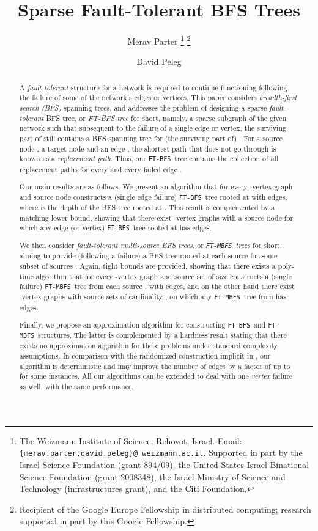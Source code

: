 \documentclass[12pt]{article}
\def\FTMBFS{\mbox{\tt FT-MBFS}}
\def\FTBFS{\mbox{\tt FT-BFS}}
\begin{document}
\title{Sparse Fault-Tolerant BFS Trees}
\author{
Merav Parter
\thanks{The Weizmann Institute of Science, Rehovot, Israel.
Email: {\tt \{merav.parter,david.peleg\}@ weizmann.ac.il}.
Supported in part by the Israel Science Foundation
(grant 894/09), the United States-Israel Binational Science Foundation
(grant 2008348), the Israel Ministry of Science and Technology
(infrastructures grant), and the Citi Foundation.}
\thanks{Recipient of the Google Europe Fellowship in distributed computing;
 research supported in part by this Google Fellowship.}
\and
David Peleg 
}


\maketitle

\begin{abstract}
A {\em fault-tolerant} structure for a network is required to continue
functioning following the failure of some of the network's edges or vertices.
This paper considers {\em breadth-first search (BFS)} spanning trees,
and addresses the problem of designing a sparse {\em fault-tolerant} BFS tree,
or {\em FT-BFS tree} for short, namely, a sparse subgraph  of the given network 
such that subsequent to the failure of a single edge or vertex,
the surviving part  of  still contains a BFS spanning tree for
(the surviving part of) . For a source node , a target node  and an edge , the shortest  path  that does not go through   is known as a \emph{replacement path}. Thus, our \FTBFS\ tree contains the collection of all replacement paths  for every  and every failed edge .
\par
Our main results are as follows. We present an algorithm that
for every -vertex graph  and source node  constructs
a (single edge failure) \FTBFS\ tree rooted at  with
 edges,
where  is the depth of the BFS tree rooted at .
This result is complemented by a matching lower bound, showing that
there exist -vertex graphs with a source node  for which any edge
(or vertex) \FTBFS\ tree rooted at  has  edges.
\par
We then consider {\em fault-tolerant multi-source BFS trees},
or {\em \FTMBFS\ trees} for short,
aiming to provide (following a failure) a BFS tree rooted at each source
 for some subset of sources .
Again, tight bounds are provided,
showing that there exists a poly-time algorithm that
for every -vertex graph and source set  of size 
constructs  a (single failure) \FTMBFS\ tree
 from each source , with 
edges, and on the other hand there exist -vertex graphs with source sets
 of cardinality , on which any \FTMBFS\
tree from  has  edges.
\par
Finally, we propose an  approximation algorithm for constructing
\FTBFS\ and \FTMBFS\ structures. The latter is complemented by a hardness
result stating that there exists no  approximation algorithm
for these problems under standard complexity assumptions. In comparison with the randomized  construction implicit in \cite{GW12},
our algorithm is deterministic  and may improve the number of edges
by a factor of up to  for some instances.
All our algorithms can be extended to deal with one \emph{vertex} failure as well, with the same performance.
\end{abstract}
\end{document}
